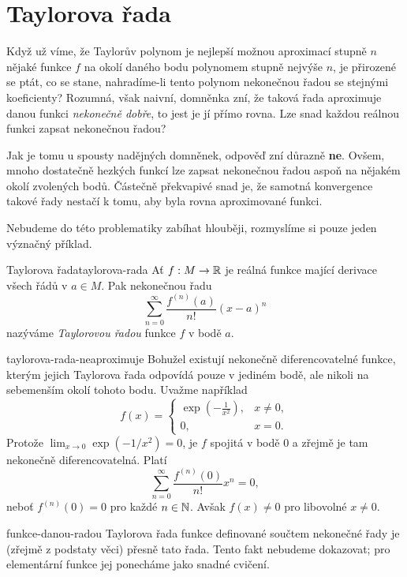 \section{Taylorova řada}
\label{sec:taylorova-rada}

Když už víme, že Taylorův polynom je nejlepší možnou aproximací stupně $n$
nějaké funkce $f$ na okolí daného bodu polynomem stupně nejvýše $n$, je
přirozené se ptát, co se stane, nahradíme-li tento polynom nekonečnou řadou se
stejnými koeficienty? Rozumná, však naivní, domněnka zní, že taková řada
aproximuje danou funkci \emph{nekonečně dobře}, to jest je jí přímo rovna. Lze
snad každou reálnou funkci zapsat nekonečnou řadou?

Jak je tomu u spousty nadějných domněnek, odpověď zní důrazně \textbf{ne}.
Ovšem, mnoho dostatečně hezkých funkcí lze zapsat nekonečnou řadou aspoň na
nějakém okolí zvolených bodů. Částečně překvapivé snad je, že samotná
konvergence takové řady nestačí k tomu, aby byla rovna aproximované funkci.

Nebudeme do této problematiky zabíhat hlouběji, rozmyslíme si pouze jeden
význačný příklad.

\begin{definition}{Taylorova řada}{taylorova-rada}
 Ať $f: M \to \mathbb{R}$ je reálná funkce mající derivace všech řádů v $a \in M$. Pak
 nekonečnou řadu
 \[
  \sum_{n=0}^{\infty} \frac{f^{(n)}(a)}{n!}(x-a)^{n}
 \]
 nazýváme \emph{Taylorovou řadou} funkce $f$ v bodě $a$.
\end{definition}

\begin{warning}{}{taylorova-rada-neaproximuje}
 Bohužel existují nekonečně diferencovatelné funkce, kterým jejich Taylorova
 řada odpovídá pouze v jediném bodě, ale nikoli na sebemenším okolí tohoto bodu.
 Uvažme například
 \[
  f(x) = \begin{cases}
   \exp \left( -\frac{1}{x^2} \right), & x \neq 0,\\
   0,& x = 0.
  \end{cases}
 \]
 Protože $\lim_{x \to 0} \exp\left(-1 / x^2\right) = 0$, je $f$ spojitá v bodě
 $0$ a zřejmě je tam nekonečně diferencovatelná. Platí
 \[
  \sum_{n=0}^{\infty} \frac{f^{(n)}(0)}{n!}x^{n} = 0,
 \]
 neboť $f^{(n)}(0) = 0$ pro každé $n \in \mathbb{N}$. Avšak $f(x) \neq 0$ pro libovolné
 $x \neq 0$.
\end{warning}

\begin{remark}{}{funkce-danou-radou}
 Taylorova řada funkce definované součtem nekonečné řady je (zřejmě z podstaty
 věci) přesně tato řada. Tento fakt nebudeme dokazovat; pro elementární funkce
 jej ponecháme jako snadné cvičení.
\end{remark}

